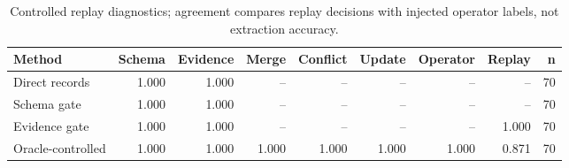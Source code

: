 \begin{table}[t]
\caption{Controlled replay diagnostics; agreement compares replay decisions with injected operator labels, not extraction accuracy.}
\label{tab:oracle-replay}
\begin{tabular*}{\hsize}{@{\extracolsep{\fill}}lrrrrrrrr@{}}
\toprule
Method & Schema & Evidence & Merge & Conflict & Update & Operator & Replay & n\\
\midrule
Direct records & 1.000 & 1.000 & -- & -- & -- & -- & -- & 70\\
Schema gate & 1.000 & 1.000 & -- & -- & -- & -- & -- & 70\\
Evidence gate & 1.000 & 1.000 & -- & -- & -- & -- & 1.000 & 70\\
Oracle-controlled & 1.000 & 1.000 & 1.000 & 1.000 & 1.000 & 1.000 & 0.871 & 70\\
\bottomrule
\end{tabular*}
\end{table}
